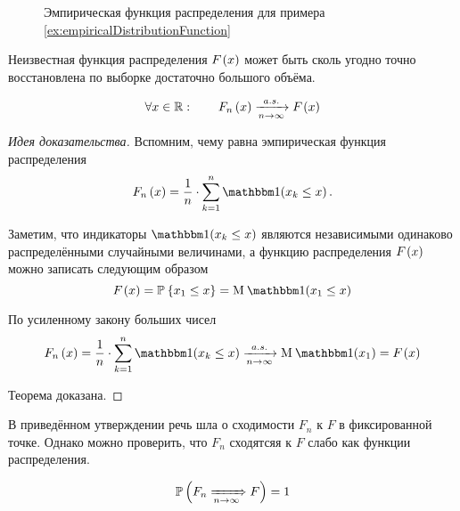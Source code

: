 \begin{figure}
  \center
  \caption{Эмпирическая функция распределения для примера
    \ref{ex:empiricalDistributionFunction}}
  \label{fig:tikz:empiricalDistributionFunction}
\end{figure}

Неизвестная функция распределения $F_{}\left(x\right)$ может быть сколь угодно
точно восстановлена по выборке достаточно большого объёма.

\begin{theorem}\label{theorem:distributionFunction:empiricalToCumulative}
  \begin{equation*}
    \forall x \in \mathbb{R}: \qquad F_n\left(x\right) \xrightarrow[n\to\infty]{a.s.} F_{}\left(x\right)
  \end{equation*}
\end{theorem}
\begin{proof}[Идея доказательства]
Вспомним, чему равна эмпирическая функция распределения
\begin{equation*}
  \cdfn{x} = \frac{1}{n} \cdot \sum_{k=1}^n \indicator{x_k\le x}.
\end{equation*}

Заметим, что индикаторы $\indicator{x_k\le x}$
являются независимыми одинаково распределёнными случайными величинами,
а функцию распределения $F_{}\left(x\right)$ можно записать следующим образом
\begin{equation*}
  \cdf{x}
  = \Probability{x_1\le x}
  = \mean{\indicator{x_1\le x}}
\end{equation*}

По усиленному закону больших чисел
\begin{equation*}
  \cdfn{x}
  = \frac{1}{n} \cdot \sum_{k=1}^n \indicator{x_k\le x}
    \acovergence \mean{\indicator{x_1}}
  = \cdf{x}
\end{equation*}

Теорема доказана.
\end{proof}

В приведённом утверждении речь шла о сходимости $F_n$ к $F$ в фиксированной
точке.
Однако можно проверить, что $F_n$ сходятсяя к $F$ слабо как функции
распределения.

\begin{theorem}
  \label{theorem:convergenceFProbability}
  \begin{equation*}
    \mathbb{P}\left( F_n \xRightarrow[n\to\infty]{} F \right) = 1
  \end{equation*}
\end{theorem}

